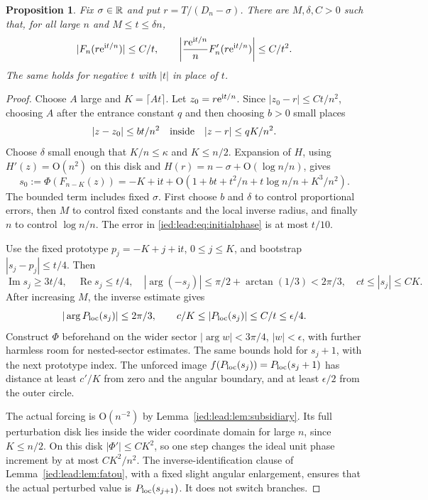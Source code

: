 \documentclass[11pt,letterpaper]{article}
\newtheorem{proposition}[theorem]{Proposition}
\theoremstyle{remark}\newtheorem{remark}[theorem]{Remark}
\newcommand{\ii}{\mathrm i}\newcommand{\dd}{\,\mathrm d}
\newcommand{\Oh}{\mathrm O}\newcommand{\supp}{\operatorname{supp}}
\newcommand{\Rea}{\operatorname{Re}}\newcommand{\Ima}{\operatorname{Im}}
\begin{document}
\begin{proposition}\label{ied:lead:prop:tail}
Fix $\sigma\in\mathbb R$ and put $r=T/(D_n-\sigma)$. There are $M,\delta,C>0$ such that, for all large $n$ and $M\le t\le\delta n$,
\begin{equation}\label{ied:lead:eq:tail}
 |F_n(r\e^{\ii t/n})|\le C/t,\qquad
 \left|\frac{r\e^{\ii t/n}}n F_n'(r\e^{\ii t/n})\right|\le C/t^2.
\end{equation}
The same holds for negative $t$ with $|t|$ in place of $t$.
\end{proposition}
\begin{proof}
Choose $A$ large and $K=\lceil At\rceil$. Let $z_0=r\e^{\ii t/n}$. Since $|z_0-r|\le Ct/n^2$, choosing $A$ after the entrance constant $q$ and then choosing $b>0$ small places
\[
 |z-z_0|\le bt/n^2
 \quad\hbox{inside}\quad |z-r|\le qK/n^2.
\]
Choose $\delta$ small enough that $K/n\le\kappa$ and $K\le n/2$. Expansion of $H$, using $H'(z)=\Oh(n^2)$ on this disk and $H(r)=n-\sigma+\Oh(\log n/n)$, gives
\begin{equation}\label{ied:lead:eq:initialphase}
 s_0:=\Phi(F_{n-K}(z))
 =-K+\ii t+\Oh(1+bt+t^2/n+t\log n/n+K^3/n^2).
\end{equation}
The bounded term includes fixed $\sigma$. First choose $b$ and $\delta$ to control proportional errors, then $M$ to control fixed constants and the local inverse radius, and finally $n$ to control $\log n/n$. The error in \eqref{ied:lead:eq:initialphase} is at most $t/10$.

Use the fixed prototype $p_j=-K+j+\ii t$, $0\le j\le K$, and bootstrap $|s_j-p_j|\le t/4$. Then
\[
 \Ima s_j\ge3t/4,\quad\Rea s_j\le t/4,\quad
 |\arg(-s_j)|\le\pi/2+\arctan(1/3)<2\pi/3,
 \quad ct\le|s_j|\le CK.
\]
After increasing $M$, the inverse estimate gives
\[
 |\arg P_{\rm loc}(s_j)|\le2\pi/3,\qquad
 c/K\le |P_{\rm loc}(s_j)|\le C/t\le\epsilon/4.
\]
Construct $\Phi$ beforehand on the wider sector $|\arg w|<3\pi/4$, $|w|<\epsilon$, with further harmless room for nested-sector estimates. The same bounds hold for $s_j+1$, with the next prototype index. The unforced image $f(P_{\rm loc}(s_j))=P_{\rm loc}(s_j+1)$ has distance at least $c'/K$ from zero and the angular boundary, and at least $\epsilon/2$ from the outer circle.

The actual forcing is $\Oh(n^{-2})$ by Lemma~\ref{ied:lead:lem:subsidiary}. Its full perturbation disk lies inside the wider coordinate domain for large $n$, since $K\le n/2$. On this disk $|\Phi'|\le CK^2$, so one step changes the ideal unit phase increment by at most $CK^2/n^2$. The inverse-identification clause of Lemma~\ref{ied:lead:lem:fatou}, with a fixed slight angular enlargement, ensures that the actual perturbed value is $P_{\rm loc}(s_{j+1})$. It does not switch branches.


\end{proof}
\end{document}
